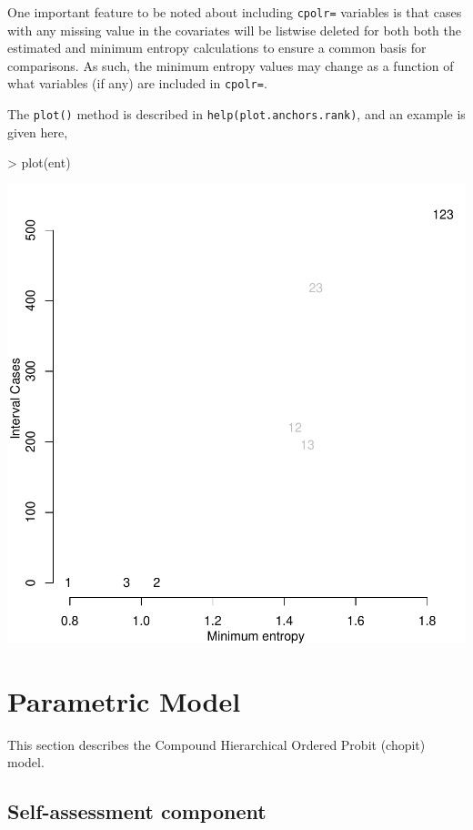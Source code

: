 \documentclass{amsart}
\newcommand{\code}[1]{{\texttt{#1}}}
\begin{document}
One important feature to be noted about including
\code{cpolr=} variables is that cases with any missing value in the
covariates will be listwise deleted for both both the estimated and
minimum entropy calculations to ensure a common basis for comparisons.
As such, the minimum entropy values may change as a function of what
variables (if any) are included in \code{cpolr=}.

The {\tt plot()} method is described in
\code{help(plot.anchors.rank)}, and an example is given here,
\begin{Schunk}
\begin{Sinput}
> plot(ent)
\end{Sinput}
\end{Schunk}
\includegraphics{anchors-entropy1}

\section{Parametric Model}

\noindent
This section describes the Compound Hierarchical Ordered Probit
(chopit) model.

\subsection{Self-assessment component}
\end{document}
